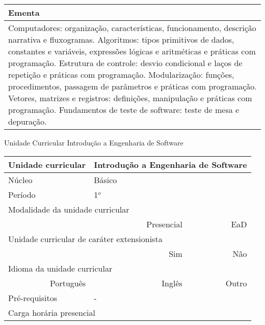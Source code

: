 \begin{quadro}[ht!]
\begin{tabular}{|p{3cm} p{2cm} p{3cm} p{2cm} p{3cm} p{2cm}|}
\multicolumn{6}{|p{15cm}|}{\cellcolor{blue1} Ementa} \\\hline
\hline\multicolumn{6}{|p{15cm}|}{\scriptsize Computadores: organização, características, funcionamento, descrição narrativa e fluxogramas. Algoritmos: tipos primitivos de dados, constantes e variáveis, expressões lógicas e aritméticas e práticas com programação. Estrutura de controle: desvio condicional e laços de repetição e práticas com programação. Modularização: funções, procedimentos, passagem de parâmetros e práticas com programação. Vetores, matrizes e registros: definições, manipulação e práticas com programação. Fundamentos de teste de software: teste de mesa e depuração.}\\\hline
\hline
	\end{tabular}
\end{quadro}
\begin{quadro}[ht!]
  \centering\scriptsize
\caption{Unidade Curricular Introdução a Engenharia de Software}
\label{ unit_1 }
\begin{tabular}{|p{3cm} p{2cm} p{3cm} p{2cm} p{3cm} p{2cm}|}\hline
\multicolumn{1}{|p{3cm}|}{\cellcolor{blue1} Unidade curricular} & \multicolumn{5}{p{9cm}|}{ Introdução a Engenharia de Software }\\\hline
\multicolumn{1}{|p{3cm}|}{\cellcolor{blue1} Núcleo} & \multicolumn{5}{p{11.5cm}|}{ Básico }\\\hline
\multicolumn{1}{|p{3cm}|}{\cellcolor{blue1} Período} & \multicolumn{5}{p{9cm}|}{ 1$^o$ }\\\hline
\multicolumn{6}{|p{15cm}|}{\cellcolor{blue1} Modalidade da unidade curricular} \\\hline
\multicolumn{2}{|r}{		} &  \multicolumn{2}{r}{Presencial \XBox } & \multicolumn{2}{r|}{EaD \Square	} \\\hline
\multicolumn{6}{|p{15cm}|}{\cellcolor{blue1} Unidade curricular de caráter extensionista} \\\hline
\multicolumn{4}{|r}{			Sim \Square	} & \multicolumn{2}{r|}{	Não \XBox	}\\\hline
\multicolumn{6}{|p{15cm}|}{\cellcolor{blue1} Idioma da unidade curricular} \\ \hline
\multicolumn{2}{|r}{	Português \XBox	} &  \multicolumn{2}{r}{	Inglês \Square	} & \multicolumn{2}{r|}{	Outro \Square	} \\ \hline
\multicolumn{1}{|p{3cm}|}{\cellcolor{blue1} Pré-requisitos} & \multicolumn{5}{p{9cm}|}{ - }\\ \hline
\multicolumn{6}{|p{15cm}|}{\cellcolor{blue1} Carga horária presencial} \\ \hline

\end{tabular}
\end{quadro}
